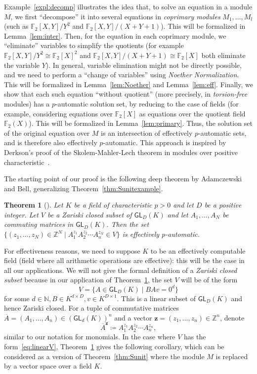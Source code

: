 \documentclass[a4paper,UKenglish,cleveref, autoref, thm-restate]{lipics-v2021}
\newcommand{\Z}{\mathbb{Z}}
\newcommand{\N}{\mathbb{N}}
\newcommand{\F}{\mathbb{F}}
\newcommand{\GL}{\mathsf{GL}}
\newcommand{\bz}{\boldsymbol{z}}
\newcommand{\oA}{\overline{A}}
\newtheorem{thrm}{Theorem}[section]
\theoremstyle{definition}
\theoremstyle{definition}
\theoremstyle{definition}
\begin{document}
Example~\ref{expl:decomp} illustrates the idea that, to solve an equation in a module $M$, we first ``decompose'' it into several equations in \emph{coprimary modules} $M_1, \ldots, M_l$ (such as $\F_2[X, Y]/Y^2$ and $\F_2[X, Y]/(X + Y + 1)$). This will be formalized in Lemma~\ref{lem:inter}.
Then, for the equation in each coprimary module, we ``eliminate'' variables to simplify the quotients (for example $\F_2[X, Y]/Y^2 \cong \F_2[X]^2$ and $\F_2[X, Y]/(X + Y + 1) \cong \F_2[X]$ both eliminate the variable $Y$). In general, variable elimination might not be directly possible, and we need to perform a ``change of variables'' using \emph{Noether Normalization}. This will be formalized in Lemma~\ref{lem:Noether} and Lemma~\ref{lem:eff}.
Finally, we show that each such equation ``without quotient'' (more precisely, in \emph{torsion-free} modules) has a $p$-automatic solution set, by reducing to the case of fields (for example, considering equations over $\F_2[X]$ as equations over the quotient field $\F_2(X)$). This will be formalized in Lemma~\ref{lem:primary}.
Thus, the solution set of the original equation over $M$ is an intersection of effectively $p$-automatic sets, and is therefore also effectively $p$-automatic.
This approach is inspired by Derkson's proof of the Skolem-Mahler-Lech theorem in modules over positive characteristic~\cite[Chapter~9]{derksen2007skolem}.

The starting point of our proof is the following deep theorem by Adamczewski and Bell, generalizing Theorem~\ref{thm:Sunitexample}.

\begin{thrm}[{\cite[Theorem~4.1]{adamczewski2012vanishing}}]\label{thm:Sunitfield}
    Let $K$ be a field of characteristic $p > 0$ and let $D$ be a positive integer. Let $V$ be a Zariski closed subset of $\GL_D(K)$ and let $A_1, \ldots, A_N$ be commuting matrices in $\GL_D(K)$. Then the set $\{(z_1, \ldots, z_N) \in \Z^N \mid A_1^{z_1} A_2^{z_2} \cdots A_n^{z_N} \in V \}$ is effectively $p$-automatic.
\end{thrm}

For effectiveness reasons, we need to suppose $K$ to be an effectively computable field (field where all arithmetic operations are effective): this will be the case in all our applications.
We will not give the formal definition of a \emph{Zariski closed subset} because in our application of Theorem~\ref{thm:Sunitfield}, the set $V$ will be of the form
\begin{equation}\label{eq:linearV}
V = \{A \in \GL_D(K) \mid BAv = 0^d\}
\end{equation}
for some $d \in \N, B \in K^{d \times D}, v \in K^{D \times 1}$. This is a linear subset of $\GL_D(K)$ and hence Zariski closed. 
For a tuple of commutative matrices $\oA = (A_1, \ldots, A_n) \in \left(\GL_d(K)\right)^n$ and a vector $\bz = (z_1, \ldots, z_n) \in \Z^n$, denote
\[
\oA^{\bz} \coloneqq A_1^{z_1} A_2^{z_2} \cdots A_n^{z_n},
\]
similar to our notation for monomials.
In the case where $V$ has the form~\eqref{eq:linearV}, Theorem~\ref{thm:Sunitfield} gives the following corollary, which can be considered as a version of Theorem~\ref{thm:Sunit} where the module $M$ is replaced by a vector space over a field $K$.
\end{document}

